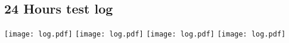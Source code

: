 \chapter{}
\label{"apx:log"}

\section{24 Hours test log}
\label{"apx:log_sec"}
\centering
\texttt{[image: log.pdf]}
\newpage
\texttt{[image: log.pdf]}
\newpage
\texttt{[image: log.pdf]}
\newpage
\texttt{[image: log.pdf]}